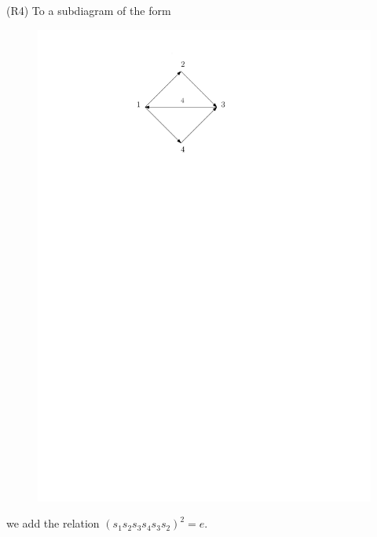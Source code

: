 \documentclass{beamer}
\begin{document}
\begin{frame}
(R4) To a subdiagram of the form
\begin{figure}
\includegraphics[scale = .50]{Diagram1.pdf}
\end{figure}
we add the relation $(s_{1}s_{2}s_{3}s_{4}s_{3}s_{2})^{2} = e$.
\end{frame}
\end{document}
